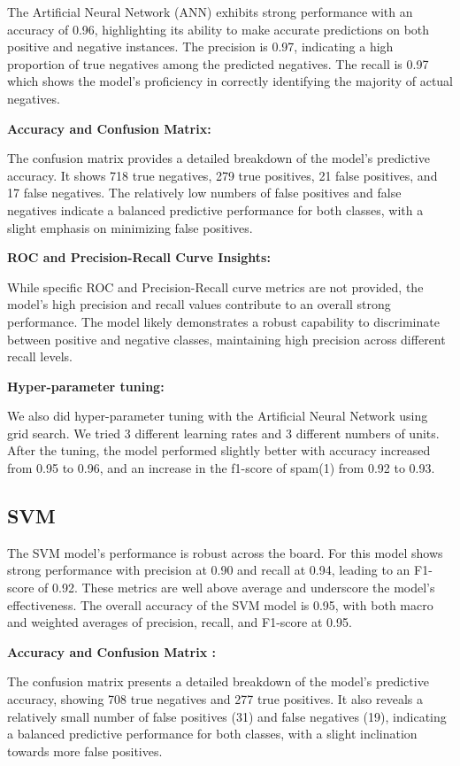 \documentclass[conference]{IEEEtran}
\begin{document}
The Artificial Neural Network (ANN) exhibits strong performance with an accuracy of 0.96, highlighting its ability to make accurate predictions on both positive and negative instances. The precision is 0.97, indicating a high proportion of true negatives among the predicted negatives. The recall is 0.97 which shows the model's proficiency in correctly identifying the majority of actual negatives.

\textbf{Accuracy and Confusion Matrix:}

The confusion matrix provides a detailed breakdown of the model's predictive accuracy. It shows 718 true negatives, 279 true positives, 21 false positives, and 17 false negatives. The relatively low numbers of false positives and false negatives indicate a balanced predictive performance for both classes, with a slight emphasis on minimizing false positives.

\textbf{ROC and Precision-Recall Curve Insights:}

While specific ROC and Precision-Recall curve metrics are not provided, the model's high precision and recall values contribute to an overall strong performance. The model likely demonstrates a robust capability to discriminate between positive and negative classes, maintaining high precision across different recall levels.

\textbf{Hyper-parameter tuning:}

We also did hyper-parameter tuning with the Artificial Neural Network using grid search. We tried 3 different learning rates and 3 different numbers of units. After the tuning, the model performed slightly better with accuracy increased from 0.95 to 0.96, and an increase in the f1-score of spam(1) from 0.92 to 0.93.

\subsection{\textbf{SVM}}

The SVM model's performance is robust across the board. For this model shows strong performance with precision at 0.90 and recall at 0.94, leading to an F1-score of 0.92. These metrics are well above average and underscore the model's effectiveness. The overall accuracy of the SVM model is 0.95, with both macro and weighted averages of precision, recall, and F1-score at 0.95.

\textbf{Accuracy and Confusion Matrix :}

The confusion matrix presents a detailed breakdown of the model's predictive accuracy, showing 708 true negatives and 277 true positives. It also reveals a relatively small number of false positives (31) and false negatives (19), indicating a balanced predictive performance for both classes, with a slight inclination towards more false positives.
\end{document}
